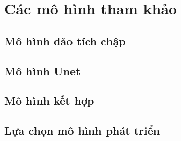 \chapter{Các mô hình tham khảo}
\section{Mô hình đảo tích chập}

\section{Mô hình Unet}
\section{Mô hình kết hợp}
\section{Lựa chọn mô hình phát triển}

